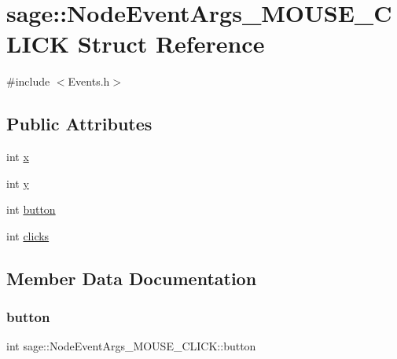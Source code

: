 \hypertarget{structsage_1_1NodeEventArgs__MOUSE__CLICK}{}\section{sage\+::Node\+Event\+Args\+\_\+\+M\+O\+U\+S\+E\+\_\+\+C\+L\+I\+CK Struct Reference}
\label{structsage_1_1NodeEventArgs__MOUSE__CLICK}


{\ttfamily \#include $<$Events.\+h$>$}

\subsection*{Public Attributes}
\begin{DoxyCompactItemize}
\item 
int \mbox{\hyperlink{structsage_1_1NodeEventArgs__MOUSE__CLICK_aea838091878c71fbf5e97adc9b6ecdef}{x}}
\item 
int \mbox{\hyperlink{structsage_1_1NodeEventArgs__MOUSE__CLICK_a2b9eedb405244d16ecc269e565c7af20}{y}}
\item 
int \mbox{\hyperlink{structsage_1_1NodeEventArgs__MOUSE__CLICK_a2cce36a873cb90d3945f9ba8354b1f36}{button}}
\item 
int \mbox{\hyperlink{structsage_1_1NodeEventArgs__MOUSE__CLICK_ac5853e899f6dc5964e01c306cab4d108}{clicks}}
\end{DoxyCompactItemize}


\subsection{Member Data Documentation}
\mbox{\label{structsage_1_1NodeEventArgs__MOUSE__CLICK_a2cce36a873cb90d3945f9ba8354b1f36}} 
\subsubsection{\texorpdfstring{button}{button}}
{\footnotesize\ttfamily int sage\+::\+Node\+Event\+Args\+\_\+\+M\+O\+U\+S\+E\+\_\+\+C\+L\+I\+C\+K\+::button}

\mbox{\label{structsage_1_1NodeEventArgs__MOUSE__CLICK_ac5853e899f6dc5964e01c306cab4d108}} 

